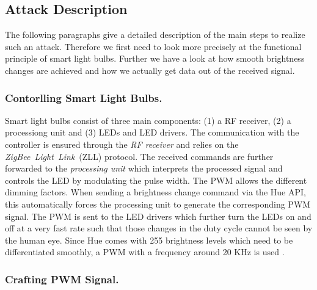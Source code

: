 \subsection{Attack Description}
\label{sec:exp:description}


The following paragraphs give a detailed description of the main steps to realize such an attack. Therefore we first need to look more precisely at the functional principle of smart light bulbs. Further we have a look at how smooth brightness changes are achieved and how we actually get data out of the received signal.\newline



\subsubsection{Contorlling Smart Light Bulbs.} 
Smart light bulbs consist of three main components: (1) a RF receiver, (2) a processiong unit and (3) LEDs and LED drivers.
The communication with the controller is ensured through the \textit{RF receiver} and relies on the \textit{ZigBee~Light~Link}~(ZLL) protocol. The received commands are further forwarded to the \textit{processing unit} which interprets the processed signal and controls the LED by modulating the pulse width. The PWM allows the different dimming factors. When sending a brightness change command via the Hue API, this automatically forces the processing unit to generate the corresponding PWM signal. The PWM is sent to the LED drivers which further turn the LEDs on and off at a very fast rate such that those changes in the duty cycle cannot be seen by the human eye. Since Hue comes with 255 brightness levels which need to be differentiated smoothly, a PWM with a frequency around 20 KHz is used \cite{Ronen:2016:EFAIDCSL}. 

\subsubsection{Crafting PWM Signal.}

